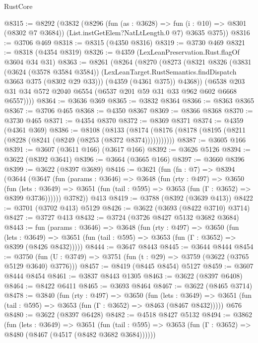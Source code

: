 \begin{lexlean}{RustCore}
\begin{coremodule}
@8315 := @8292
    (@3832
      (@8296
        (fun (as : @3628) => fun (i : @10) => @8301 (@8302 @7 @3684))
        (List.instGetElem?NatLtLength.{0} @7)
        @3635
        @375))
@8316 := @3706 @469
@8318 := @8315 (@4350 @8316)
@8319 := @3730 @469
@8321 := @8318 (@4354 @8319)
@8326 := @4359 (LexLeanPreservation.Rust.flagOf @3604 @34 @31)
@8363 := @8261
    (@8264
      (@8270
        (@8273
          (@8321
            @8326
            (@3831
              (@3624 (@3578 @3584 @3584))
              (LexLeanTarget.RustSemantics.findDispatch @3663 @375 (@8302 @29 @33)))
            (@4359 (@4361 @375))
            @4368))
        (@6538 @203 @31 @34 @572 @2040 @6554 (@6537 @201 @59 @31 @33 @962 @602 @6668 @6557))))
@8364 := @3636 @369
@8365 := @3832 @8364
@8366 := @8363 @8365
@8367 := @3706 @465
@8368 := @4350 @8367
@8369 := @8366 @8368
@8370 := @3730 @465
@8371 := @4354 @8370
@8372 := @8369 @8371
@8374 := @4359 (@4361 @369)
@8386 := @8108
    (@8133 (@8174 (@8176 (@8178 (@8195 (@8211 (@8228 (@8241 (@8249 (@8253 (@8372 @8374)))))))))))
@8387 := @3605 @166
@8391 := @3607 (@3611 @166) (@3617 @166)
@8392 := @3626 @5126
@8394 := @3622 (@8392 @3641)
@8396 := @3664 (@3665 @166)
@8397 := @3660 @8396
@8399 := @3622 (@8397 @3689)
@8416 := @3621
    (fun (fn : @7) =>
    @8394
      (@3644
        (@3647
          (fun (params : @3646) =>
          @3648
            (fun (rty : @497) =>
            @3650
              (fun (lets : @3649) =>
              @3651 (fun (tail : @595) => @3653 (fun (Γ : @3652) => @8399 @3736))))))
        @3782))
    @413
@8419 := @3788 (@8392 (@3639 @413))
@8422 := @3701 (@3702 @413) @5129
@8426 := @3622 (@3693 (@8422 @3710) @3714)
@8427 := @3727 @413
@8432 := @3724 (@3726 @8427 @5132 @3682 @3684)
@8443 := fun (params : @3646) =>
  @3648
    (fun (rty : @497) =>
    @3650
      (fun (lets : @3649) =>
      @3651 (fun (tail : @595) => @3653 (fun (Γ : @3652) => @8399 (@8426 @8432)))))
@8444 := @3647 @8443
@8445 := @3644 @8444
@8454 := @3750 (fun (U : @3749) => @3751 (fun (t : @29) => @3759 (@3622 (@3765 @5129 @3640) @3776)))
@8457 := @8419 (@8445 @8454) @5127
@8459 := @3607 @8444 @8454
@8461 := @3837 @8443 @1305
@8463 := @3622 (@8397 @6408)
@8464 := @8422 @6411
@8465 := @3693 @8464
@8467 := @3622 (@8465 @3714)
@8478 := @3840
    (fun (rty : @497) =>
    @3650
      (fun (lets : @3649) =>
      @3651 (fun (tail : @595) => @3653 (fun (Γ : @3652) => @8463 (@8467 @8432)))))
    @676
@8480 := @3622 (@8397 @6428)
@8482 := @4518 @8427 @5132
@8494 := @3862
    (fun (lets : @3649) =>
    @3651
      (fun (tail : @595) => @3653 (fun (Γ : @3652) => @8480 (@8467 (@4517 (@8482 @3682 @3684))))))

\end{coremodule}
\end{lexlean}
